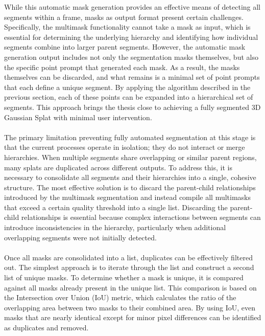 \documentclass[12pt]{article}
\begin{document}
\FloatBarrier
\noindent
While this automatic mask generation provides an effective means of detecting all segments within a frame, masks as output format present certain challenges. Specifically, the multimask functionality cannot take a mask as input, which is essential for determining the underlying hierarchy and identifying how individual segments combine into larger parent segments. However, the automatic mask generation output includes not only the segmentation masks themselves, but also the specific point prompt that generated each mask. As a result, the masks themselves can be discarded, and what remains is a minimal set of point prompts that each define a unique segment. By applying the algorithm described in the previous section, each of these points can be expanded into a hierarchical set of segments. This approach brings the thesis close to achieving a fully segmented 3D Gaussian Splat with minimal user intervention.
\\\\
The primary limitation preventing fully automated segmentation at this stage is that the current processes operate in isolation; they do not interact or merge hierarchies. When multiple segments share overlapping or similar parent regions, many splats are duplicated across different outputs. To address this, it is necessary to consolidate all segments and their hierarchies into a single, cohesive structure. The most effective solution is to discard the parent-child relationships introduced by the multimask segmentation and instead compile all multimasks that exceed a certain quality threshold into a single list. Discarding the parent-child relationships is essential because complex interactions between segments can introduce inconsistencies in the hierarchy, particularly when additional overlapping segments were not initially detected.
\\\\
Once all masks are consolidated into a list, duplicates can be effectively filtered out. The simplest approach is to iterate through the list and construct a second list of unique masks. To determine whether a mask is unique, it is compared against all masks already present in the unique list. This comparison is based on the Intersection over Union (IoU) metric, which calculates the ratio of the overlapping area between two masks to their combined area. By using IoU, even masks that are nearly identical except for minor pixel differences can be identified as duplicates and removed.
\\\\
\end{document}
